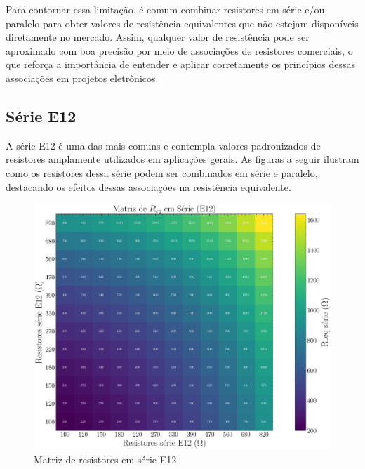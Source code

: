 \documentclass[conference]{IEEEtran}
\begin{document}
Para contornar essa limitação, é comum combinar resistores em série e/ou paralelo para obter valores de resistência equivalentes que não estejam disponíveis diretamente no mercado.
Assim, qualquer valor de resistência pode ser aproximado com boa precisão por meio de associações de resistores comerciais,%
o que reforça a importância de entender e aplicar corretamente os princípios dessas associações em projetos eletrônicos.

\subsection{Série E12} %

A série E12 é uma das mais comuns e contempla valores padronizados de resistores amplamente utilizados em aplicações gerais. As figuras %
a seguir ilustram como os resistores dessa série podem ser combinados em série e paralelo, destacando os efeitos dessas associações na resistência equivalente.%


\begin{figure}[htbp]
    \centering
    \caption{Matriz de resistores em série E12}
    \label{fig:matriz_serie_e12}
    \includegraphics[width=0.8\linewidth]{figures/matriz_serie_e12.pdf}
\end{figure}
\end{document}
